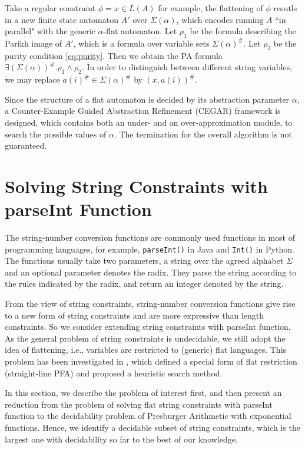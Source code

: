 \documentclass[runningheads]{llncs}
\newcommand{\parseInt}{\textsf{parseInt}}
\begin{document}
Take a regular constraint $\phi = x\in L(A)$ for example,
the flattening of $\phi$ resutls in a new finite state automaton $A'$ over $\Sigma(\alpha)$,
which encodes running $A$ ``in parallel" 
with the generic $\alpha$-flat automaton.
Let $\rho_1$ be the formula describing the Parikh image of $A'$,
which is a formula over variable sets $\Sigma(\alpha)^\#$.
Let $\rho_2$ be the purity condition \eqref{eq:purity}.
Then we obtain the PA formula $\exists (\Sigma(\alpha))^\#. \rho_1 \wedge \rho_2$.
In order to distinguish between different string variables,
we may replace $a(i)^\# \in \Sigma(\alpha)^\#$ by $(x,a(i))^\#$.

Since the structure of a flat automaton is decided 
by its abstraction parameter $\alpha$, 
a Counter-Example Guided Abstraction 
Refinement (CEGAR) framework is designed, which contains both an under- and an 
over-approximation module, to search the possible values of $\alpha$.
The termination for the overall algorithm is not guaranteed.

\section{Solving String Constraints with \textsf{parseInt} Function}\label{sec:string-solving}

The string-number conversion functions are commonly used functions
in most of programming languages,
for example,
\verb+parseInt()+ in Java and \verb+Int()+ in Python.
The functions usually take two parameters, 
a string over the agreed alphabet $\Sigma$
and an optional parameter denotes the radix.
They parse the string according to the rules indicated by the radix,
and return an integer denoted by the string.

From the view of string constraints,
string-number conversion functions give rise to a new form of string constraints
and are more expressive than length constraints.
So we consider extending string constraints with 
{\parseInt} function. 
As the general problem of string constraints is undecidable,
we still adopt the idea of flattening, 
i.e., variables are restricted to (generic) flat languages.
This problem has been investigated in \cite{POPL20},
which defined a special form of flat restriction (straight-line PFA) and 
proposed a heuristic search method.

In this section, 
we describe the problem of interest first, and then 
present an reduction from the problem of solving flat string constraints with {\parseInt} function
to the decidability problem of Presburger Arithmetic with exponential functions.
Hence, we identify a decidable subset of string constraints, which is the largest one with decidability so far to the best of our knowledge.
\end{document}
